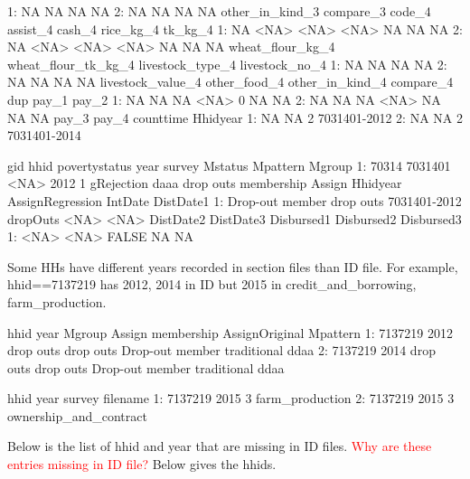 \begin{Schunk}
\begin{Soutput}
1:               NA             NA                NA           NA
2:               NA             NA                NA           NA
   other_in_kind_3 compare_3 code_4 assist_4 cash_4 rice_kg_4 tk_kg_4
1:              NA      <NA>   <NA>     <NA>     NA        NA      NA
2:              NA      <NA>   <NA>     <NA>     NA        NA      NA
   wheat_flour_kg_4 wheat_flour_tk_kg_4 livestock_type_4 livestock_no_4
1:               NA                  NA               NA             NA
2:               NA                  NA               NA             NA
   livestock_value_4 other_food_4 other_in_kind_4 compare_4 dup pay_1 pay_2
1:                NA           NA              NA      <NA>   0    NA    NA
2:                NA           NA              NA      <NA>  NA    NA    NA
   pay_3 pay_4 counttime     Hhidyear
1:    NA    NA         2 7031401-2012
2:    NA    NA         2 7031401-2014
\end{Soutput}
\begin{Soutput}
     gid    hhid povertystatus year survey    Mstatus Mpattern    Mgroup
1: 70314 7031401          <NA> 2012      1 gRejection     daaa drop outs
        membership    Assign     Hhidyear AssignRegression IntDate DistDate1
1: Drop-out member drop outs 7031401-2012         dropOuts    <NA>      <NA>
   DistDate2 DistDate3 Disbursed1 Disbursed2 Disbursed3
1:      <NA>      <NA>      FALSE         NA         NA
\end{Soutput}
\end{Schunk}
Some HHs have different years recorded in section files than ID file. For example, \textsf{hhid}==7137219 has 2012, 2014 in ID but 2015 in \textsf{credit\_and\_borrowing, farm\_production}. 
\begin{Schunk}
\begin{Soutput}
      hhid year    Mgroup    Assign      membership AssignOriginal Mpattern
1: 7137219 2012 drop outs drop outs Drop-out member    traditional     ddaa
2: 7137219 2014 drop outs drop outs Drop-out member    traditional     ddaa
\end{Soutput}
\begin{Soutput}
      hhid year survey               filename
1: 7137219 2015      3        farm_production
2: 7137219 2015      3 ownership_and_contract
\end{Soutput}
\end{Schunk}
Below is the list of \textsf{hhid} and \textsf{year} that are missing in ID files. \textcolor{red}{Why are these entries missing in ID file?} Below gives the \textsf{hhid}s.
